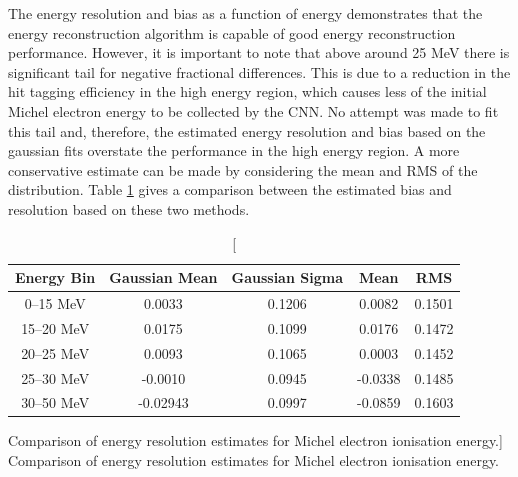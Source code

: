 The energy resolution and bias as a function of energy demonstrates that the
energy reconstruction algorithm is capable of good energy reconstruction
performance. However, it is important to note that above around 25 MeV there is
significant tail for negative fractional differences. This is due to a reduction
in the hit tagging efficiency in the high energy region, which causes less of
the initial Michel electron energy to be collected by the CNN. No attempt was
made to fit this tail and, therefore, the estimated energy resolution and bias
based on the gaussian fits overstate the performance in the high energy region. 
A more conservative estimate can be made by considering the mean and RMS of the 
distribution. Table \ref{tab:gaus_v_mean} gives a comparison between the 
estimated bias and resolution based on these two methods.
\begin{table}
	\centering
	\bgroup
	\def\arraystretch{1.5}
	\begin{tabular}{c|c|c|c|c}
		Energy Bin & Gaussian Mean & Gaussian Sigma & Mean    & RMS    \\ \hline
		0--15 MeV  & 0.0033        & 0.1206         & 0.0082  & 0.1501 \\
		15--20 MeV & 0.0175        & 0.1099         & 0.0176  & 0.1472 \\
		20--25 MeV & 0.0093        & 0.1065         & 0.0003  & 0.1452 \\
		25--30 MeV & -0.0010       & 0.0945         & -0.0338 & 0.1485 \\
		30--50 MeV & -0.02943      & 0.0997         & -0.0859 & 0.1603 \\
	\end{tabular}
	\egroup
	\caption
	[Comparison of energy resolution estimates for Michel electron ionisation
	energy.]
	{ Comparison of energy resolution estimates for Michel electron ionisation
	energy. }
	\label{tab:gaus_v_mean}
\end{table}

